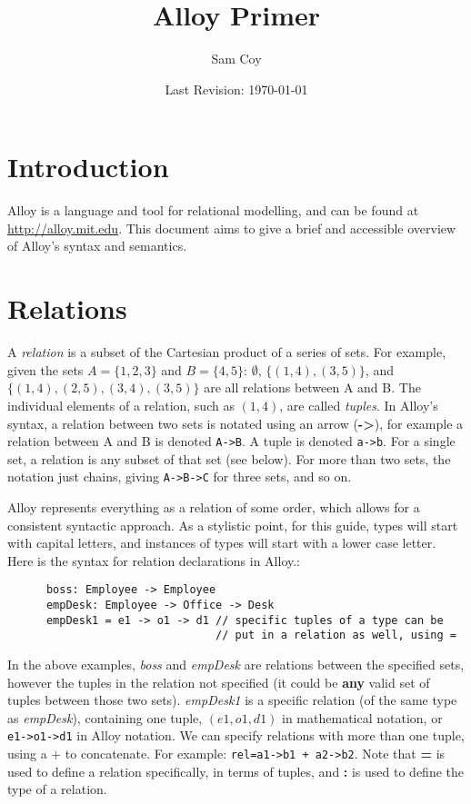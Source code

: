 \documentclass[10pt]{article}
\title{Alloy Primer}
\author{Sam Coy}
\date{Last Revision: \today}
\begin{document}
\maketitle

  \section*{Introduction}
    Alloy is a language and tool for relational modelling, and can be found at \url{http://alloy.mit.edu}. This document aims to give a brief and accessible overview of Alloy's syntax and semantics.

  \section*{Relations}
    A \textit{relation} is a subset of the Cartesian product of a series of sets. For example, given the sets $A=\{1, 2, 3\}$ and $B=\{4, 5\}$: $\emptyset$, $\{(1,4), (3, 5)\}$, and $\{(1,4), (2,5), (3,4), (3,5)\}$ are all relations between A and B. The individual elements of a relation, such as $(1,4)$, are called \textit{tuples}. In Alloy's syntax, a relation between two sets is notated using an arrow (\textbf{-\textgreater}), for example a relation between A and B is denoted \lstinline|A->B|. A tuple is denoted \lstinline|a->b|. For a single set, a relation is any subset of that set (see below). For more than two sets, the notation just chains, giving \lstinline|A->B->C| for three sets, and so on.\par
    Alloy represents everything as a relation of some order, which allows for a consistent syntactic approach. As a stylistic point, for this guide, types will start with capital letters, and instances of types will start with a lower case letter. Here is the syntax for relation declarations in Alloy.:
    \begin{lstlisting}
      boss: Employee -> Employee
      empDesk: Employee -> Office -> Desk
      empDesk1 = e1 -> o1 -> d1 // specific tuples of a type can be
                                // put in a relation as well, using =
    \end{lstlisting} \par
    In the above examples, \textit{boss} and \textit{empDesk} are relations between the specified sets, however the tuples in the relation not specified (it could be \textbf{any} valid set of tuples between those two sets). \textit{empDesk1} is a specific relation (of the same type as \textit{empDesk}), containing one tuple, $(e1, o1, d1)$ in mathematical notation, or \lstinline|e1->o1->d1| in Alloy notation. We can specify relations with more than one tuple, using a + to concatenate. For example: \lstinline|rel=a1->b1 + a2->b2|. Note that \textbf{=} is used to define a relation specifically, in terms of tuples, and \textbf{:} is used to define the type of a relation.\par
\end{document}
